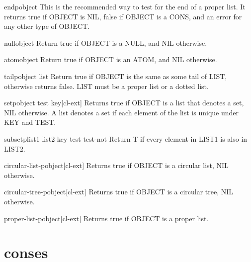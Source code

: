 \documentclass[10pt,english]{book}
\begin{document}
\begin{function}{endp}{object}
  This is the recommended way to test for the end of a proper list. It
  returns true if OBJECT is NIL, false if OBJECT is a CONS, and an error
  for any other type of OBJECT.
\end{function}

\begin{function}{null}{object}
  Return true if OBJECT is a NULL, and NIL otherwise.
\end{function}

\begin{function}{atom}{object}
  Return true if OBJECT is an ATOM, and NIL otherwise.
\end{function}

\begin{function}{tailp}{object list}
  Return true if OBJECT is the same as some tail of LIST, otherwise
   returns false. LIST must be a proper list or a dotted list.
\end{function}

\begin{function}{setp}{object \key test key}[cl-ext]
  Returns true if OBJECT is a list that denotes a set, NIL otherwise. A list
denotes a set if each element of the list is unique under KEY and TEST.
\end{function}

\begin{function}{subsetp}{list1 list2 \key key test test-not}
  Return T if every element in LIST1 is also in LIST2.
\end{function}

\begin{function}{circular-list-p}{object}[cl-ext]
  Returns true if OBJECT is a circular list, NIL otherwise.
\end{function}

\begin{function}{circular-tree-p}{object}[cl-ext]
  Returns true if OBJECT is a circular tree, NIL otherwise.
\end{function}

\begin{function}{proper-list-p}{object}[cl-ext]
  Returns true if OBJECT is a proper list.
\end{function}

\section{conses}
\label{sec:conses}
\end{document}
